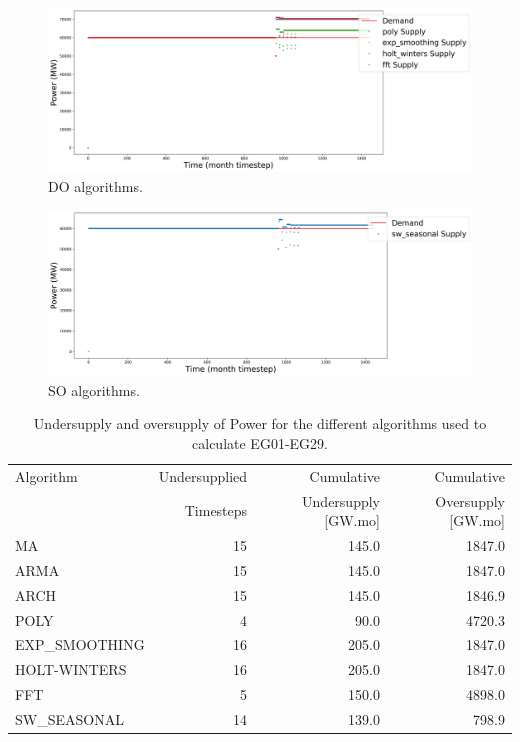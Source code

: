 \documentclass[11pt]{article}
\begin{document}
\begin{figure}[!h]
	\centering
	\includegraphics[width=\textwidth]{29-figures/29-power0-buffer02.png} 
	\hfill
	\caption{DO algorithms.}
	\label{fig:29-DO}
\end{figure}

\begin{figure}[!h]
	\centering
	\includegraphics[width=\textwidth]{29-figures/29-power0-buffer03.png} 
	\hfill
	\caption{SO algorithms.}
	\label{fig:29-SO}
\end{figure}

\begin{table}[!h]
	\centering
	\caption{Undersupply and oversupply of Power for the different algorithms used to calculate EG01-EG29.}
	\label{tab:29-power}
	\begin{tabularx}{\textwidth}{lRRR}
		\hline
		Algorithm & Undersupplied & Cumulative  & Cumulative \\
		& Timesteps     & Undersupply [GW.mo]  & Oversupply [GW.mo] \\ \hline
		MA        & 15 	& 145.0 & 1847.0 \\ 
		ARMA      & 15 	& 145.0 & 1847.0 \\ 
		ARCH      & 15 	& 145.0 & 1846.9 \\ 
		POLY      &  4 	& 90.0 & 4720.3 \\ 
		EXP\_SMOOTHING 	& 16 & 205.0 & 1847.0 \\ 
		HOLT-WINTERS  	& 16 & 205.0 & 1847.0 \\ 
		FFT       &  5	& 150.0	& 4898.0 \\ 
		SW\_SEASONAL    & 14 & 139.0 & 798.9 \\ \hline
	\end{tabularx}
\end{table}
\end{document}
